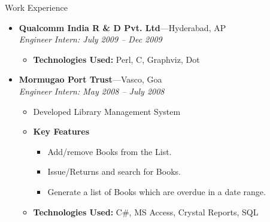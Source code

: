 \documentclass[11pt,oneside]{article}
\newenvironment{ressection}[1]{
	\vspace{4pt}
	{\fontfamily{phv}\selectfont\Large#1}
	\begin{itemize}
	\vspace{3pt}
}{
	\end{itemize}
}
\newcommand{\resitem}[1]{
	\vspace{-4pt}
	\item \begin{flushleft} #1 \end{flushleft}
}
\newcommand{\ressubitem}[1]{
	\vspace{-1pt}
	\item \begin{flushleft} #1 \end{flushleft}
}
\newcommand{\resbigitem}[3]{
	\vspace{-5pt}
	\item
	\textbf{#1}---#2 \\
	\textit{#3}
}
\newenvironment{ressubsec}[3]{
	\resbigitem{#1}{#2}{#3}
	\vspace{-2pt}
	\begin{itemize}
}{
	\end{itemize}
}
\newenvironment{reslist}[1]{
	\resitem{\textbf{#1}}
	\vspace{-5pt}
	\begin{itemize}
}{
	\end{itemize}
}
\begin{document}
\begin{ressection}{Work Experience}
\begin{ressubsec}{Qualcomm India R \& D Pvt. Ltd}{Hyderabad, AP}{Engineer Intern: July 2009 -- Dec 2009}
		\ressubitem{\textbf{Technologies Used:} Perl, C, Graphviz, Dot}
	\end{ressubsec}

	\begin{ressubsec}{Mormugao Port Trust}{Vasco, Goa}{Engineer Intern: May 2008 -- July 2008}
	    \ressubitem{Developed Library Management System}
		
	     \begin{reslist}{Key Features}

		    \ressubitem{Add/remove Books from the List.}
		    \ressubitem{Issue/Returns and search for Books.}
		    \ressubitem{Generate a list of Books which are overdue in a date range.}

	     \end{reslist}
		
		\ressubitem{\textbf{Technologies Used:} C\#, MS Access, Crystal Reports, SQL}
	\end{ressubsec}
\end{ressection}
\end{document}
